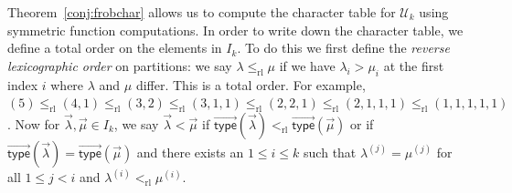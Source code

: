 \documentclass[10pt]{amsart}
\theoremstyle{definition}
\theoremstyle{remark}
\newcommand{\defncolor}{\color{darkred}}
\newcommand{\defn}[1]{{\defncolor\emph{#1}}} %
\newcommand{\vtype}{\overrightarrow{\mathsf{type}}}
\begin{document}
Theorem~\ref{conj:frobchar} allows us to compute the character table for
$\mathcal{U}_k$ using symmetric function computations.
In order to write down the character table, we define a total order on the elements in $I_k$.  To do this we first define the \defn{reverse lexicographic order}
on partitions: we say \defn{$\lambda\leqslant_{\mathrm{rl}} \mu$} if we have $\lambda_i > \mu_i$ at the first index $i$ where $\lambda$ and $\mu$ differ.
This is a total order. For example, $(5) \leqslant_{\mathrm{rl}} (4,1) \leqslant_{\mathrm{rl}} (3,2) \leqslant_{\mathrm{rl}} (3,1,1) \leqslant_{\mathrm{rl}} (2,2,1) \leqslant_{\mathrm{rl}} (2,1,1,1) \leqslant_{\mathrm{rl}} (1,1,1,1,1)$.
Now for $\vec{\lambda},\vec{\mu}\in I_k$, we say \defn{$\vec{\lambda}< \vec{\mu}$} if
$\vtype(\vec{\lambda}) <_{\mathrm{rl}} \vtype(\vec{\mu})$ or if $\vtype(\vec{\lambda}) = \vtype(\vec{\mu})$ and there exists an
$1 \leqslant i \leqslant k$ such that $\lambda^{(j)} = \mu^{(j)}$ for all $1 \leqslant j < i$ and
$\lambda^{(i)} <_{\mathrm{rl}} \mu^{(i)}$.
\end{document}
